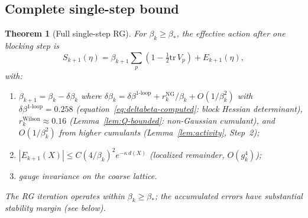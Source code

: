 \documentclass[11pt]{article}
\newtheorem{theorem}{Theorem}[section]
\theoremstyle{definition}
\newcommand{\tr}{\mathrm{tr}}
\begin{document}
\subsection{Complete single-step bound}

\begin{theorem}[Full single-step RG]\label{thm:singlestep}
For $\beta_k\ge\beta_*$, the effective action after one blocking step is
\begin{equation}
S_{k+1}(\eta)=\beta_{k+1}\sum_p(1-\tfrac{1}{2}\tr\,V_p)+E_{k+1}(\eta),
\end{equation}
with:
\begin{enumerate}[nosep,label=(\roman*)]
\item $\beta_{k+1}=\beta_k-\delta\beta_k$ where
$\delta\beta_k=\delta\beta^{1\text{-loop}}
+r_k^{\mathrm{NG}}/\beta_k+O(1/\beta_k^2)$
with $\delta\beta^{1\text{-loop}}=0.258$
(equation~\eqref{eq:deltabeta-computed}: block Hessian
determinant), $r_k^{\mathrm{Wilson}}\approx 0.16$
(Lemma~\ref{lem:Q-bounded}: non-Gaussian cumulant),
and $O(1/\beta_k^2)$ from higher cumulants
(Lemma~\ref{lem:activity}, Step~2);
\item $|E_{k+1}(X)|\le C(4/\beta_k)^2 e^{-\kappa\,d(X)}$
(localized remainder, $O(g_k^4)$);
\item gauge invariance on the coarse lattice.
\end{enumerate}
The RG iteration operates within $\beta_k\ge\beta_*$;
the accumulated errors have substantial stability margin (see below).


\end{theorem}
\end{document}
